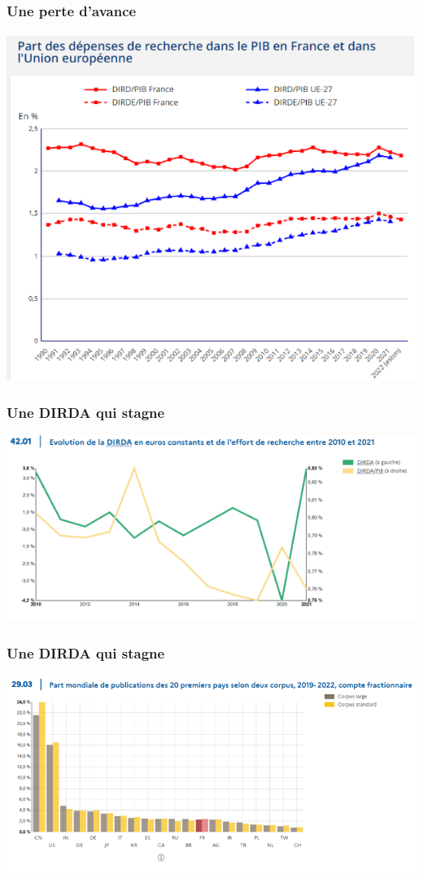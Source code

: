 \documentclass[xcolor=dvipsnames]{beamer}
\begin{document}
	\begin{frame}
		\frametitle{Une perte d'avance}
		\centering
		\includegraphics[scale=0.8]{DIRDA.PNG}
	\end{frame}
	\begin{frame}
		\frametitle{Une DIRDA qui stagne}
		\centering
		\includegraphics[scale=1.1]{DIRDA euro.PNG}
	\end{frame}
	\begin{frame}
		\frametitle{Une DIRDA qui stagne}
		\centering
		\includegraphics[scale=0.8]{Publications.PNG}
	\end{frame}
	
\end{document}
